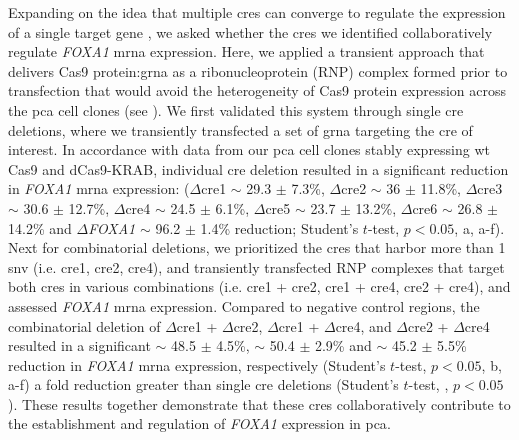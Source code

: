 Expanding on the idea that multiple \glspl{cre} can converge to regulate the expression of a single target gene \cite{sallariConvergenceDispersedRegulatory2016,baileyNoncodingSomaticInherited2016,pennacchioEnhancersFiveEssential2013}, we asked whether the \glspl{cre} we identified collaboratively regulate \emph{FOXA1} \gls{mrna} expression.
Here, we applied a transient approach that delivers Cas9 protein:\gls{grna} as a ribonucleoprotein (RNP) complex formed prior to transfection that would avoid the heterogeneity of Cas9 protein expression across the \gls{pca} cell clones (see ).
We first validated this system through single \gls{cre} deletions, where we transiently transfected a set of \gls{grna} targeting the \gls{cre} of interest.
In accordance with data from our \gls{pca} cell clones stably expressing \gls{wt} Cas9 and dCas9-KRAB, individual \gls{cre} deletion resulted in a significant reduction in \emph{FOXA1} \gls{mrna} expression: ($\Delta$\gls{cre}1 $\sim$ 29.3 $\pm$ 7.3\%, $\Delta$\gls{cre}2 $\sim$ 36 $\pm$ 11.8\%, $\Delta$\gls{cre}3 $\sim$ 30.6 $\pm$ 12.7\%, $\Delta$\gls{cre}4 $\sim$ 24.5 $\pm$ 6.1\%, $\Delta$\gls{cre}5 $\sim$ 23.7 $\pm$ 13.2\%, $\Delta$\gls{cre}6 $\sim$ 26.8 $\pm$ 14.2\% and $\Delta$\emph{FOXA1} $\sim$ 96.2 $\pm$ 1.4\% reduction; Student's $t$-test, $p < 0.05$, a, a-f).
Next for combinatorial deletions, we prioritized the \glspl{cre} that harbor more than 1 \gls{snv} (i.e. \gls{cre}1, \gls{cre}2, \gls{cre}4), and transiently transfected RNP complexes that target both \glspl{cre} in various combinations (i.e. \gls{cre}1 + \gls{cre}2, \gls{cre}1 + \gls{cre}4, \gls{cre}2 + \gls{cre}4), and assessed \emph{FOXA1} \gls{mrna} expression.
Compared to negative control regions, the combinatorial deletion of $\Delta$\gls{cre}1 + $\Delta$\gls{cre}2, $\Delta$\gls{cre}1 + $\Delta$\gls{cre}4, and $\Delta$\gls{cre}2 + $\Delta$\gls{cre}4 resulted in a significant $\sim$ 48.5 $\pm$ 4.5\%, $\sim$ 50.4 $\pm$ 2.9\% and $\sim$ 45.2 $\pm$ 5.5\% reduction in \emph{FOXA1} \gls{mrna} expression, respectively (Student's $t$-test, $p<0.05$, b, a-f) a fold reduction greater than single \gls{cre} deletions (Student's $t$-test, , $p<0.05$).
These results together demonstrate that these \glspl{cre} collaboratively contribute to the establishment and regulation of \emph{FOXA1} expression in \gls{pca}.

